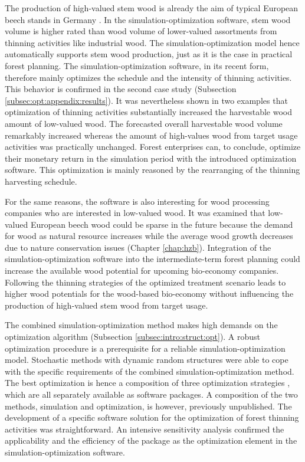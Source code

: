 The production of high-valued stem wood is already the aim of typical European beech stands in Germany \citep{nagel_2008}. In the simulation-optimization software, stem wood volume is higher rated than wood volume of lower-valued assortments from thinning activities like industrial wood. The simulation-optimization model hence automatically supports stem wood production, just as it is the case in practical forest planning. The simulation-optimization software, in its recent form, therefore mainly optimizes the schedule and the intensity of thinning activities. This behavior is confirmed in the second case study (Subsection \ref{subsec:opt:appendix:results}). It was nevertheless shown in two examples that optimization of thinning activities substantially increased the harvestable wood amount of low-valued wood. The forecasted overall harvestable wood volume remarkably increased whereas the amount of high-values wood from target usage activities was practically unchanged. Forest enterprises can, to conclude, optimize their monetary return in the simulation period with the introduced optimization software. This optimization is mainly reasoned by the rearranging of the thinning harvesting schedule.

For the same reasons, the software is also interesting for wood processing companies who are interested in low-valued wood. It was examined that low-valued European beech wood could be sparse in the future because the demand for wood as natural resource increases while the average wood growth decreases due to nature conservation issues (Chapter \ref{chap:hzb}). Integration of the simulation-optimization software into the intermediate-term forest planning could increase the available wood potential for upcoming bio-economy companies. Following the thinning strategies of the optimized treatment scenario leads to higher wood potentials for the wood-based bio-economy without influencing the production of high-valued stem wood from target usage.

The combined si\-mu\-la\-tion-op\-ti\-mi\-za\-tion method makes high demands on the optimization algorithm (Subsection \ref{subsec:intro:struct:opt}). A robust optimization procedure is a prerequisite for a reliable si\-mu\-la\-tion-op\-ti\-mi\-za\-tion model. Stochastic methods with dynamic random structures were able to cope with the specific requirements of the combined si\-mu\-la\-tion-op\-ti\-mi\-za\-tion method. The best optimization is hence a composition of three optimization strategies \citep{corana_1987, kirkpatrick_1983, pronzato_1984}, which are all separately available as software packages. A composition of the two methods, simulation and optimization, is however, previously unpublished. The development of a specific software solution for the optimization of forest thinning activities was straightforward. An intensive sensitivity analysis confirmed the applicability and the efficiency of the package as the optimization element in the si\-mu\-la\-tion-op\-ti\-mi\-za\-tion software.

